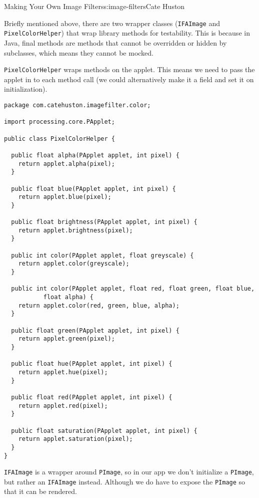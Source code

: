 \begin{aosachapter}{Making Your Own Image Filters}{s:image-filters}{Cate Huston}

\label{wrapper-classes-and-tests}

Briefly mentioned above, there are two wrapper classes
(\texttt{IFAImage} and \texttt{PixelColorHelper}) that wrap library
methods for testability. This is because in Java, final methods are
methods that cannot be overridden or hidden by subclasses, which means
they cannot be mocked.

\texttt{PixelColorHelper} wraps methods on the applet. This means we
need to pass the applet in to each method call (we could alternatively
make it a field and set it on initialization).

\begin{verbatim}
package com.catehuston.imagefilter.color;

import processing.core.PApplet;

public class PixelColorHelper {

  public float alpha(PApplet applet, int pixel) {
    return applet.alpha(pixel);
  }

  public float blue(PApplet applet, int pixel) {
    return applet.blue(pixel);
  }

  public float brightness(PApplet applet, int pixel) {
    return applet.brightness(pixel);
  }

  public int color(PApplet applet, float greyscale) {
    return applet.color(greyscale);
  }

  public int color(PApplet applet, float red, float green, float blue,
           float alpha) {
    return applet.color(red, green, blue, alpha);
  }

  public float green(PApplet applet, int pixel) {
    return applet.green(pixel);
  }

  public float hue(PApplet applet, int pixel) {
    return applet.hue(pixel);
  }

  public float red(PApplet applet, int pixel) {
    return applet.red(pixel);
  }

  public float saturation(PApplet applet, int pixel) {
    return applet.saturation(pixel);
  }
}
\end{verbatim}

\texttt{IFAImage} is a wrapper around \texttt{PImage}, so in our app we
don't initialize a \texttt{PImage}, but rather an \texttt{IFAImage}
instead. Although we do have to expose the \texttt{PImage} so that it
can be rendered.


\end{aosachapter}
